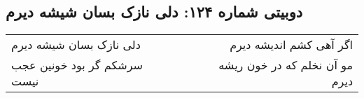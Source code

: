 \begin{center}
\section*{دوبیتی شماره ۱۲۴: دلی نازک بسان شیشه دیرم}
\label{sec:124}
\begin{longtable}{l p{0.5cm} r}
دلی نازک بسان شیشه دیرم
&&
اگر آهی کشم اندیشه دیرم
\\
سرشکم گر بود خونین عجب نیست
&&
مو آن نخلم که در خون ریشه دیرم
\\
\end{longtable}
\end{center}
